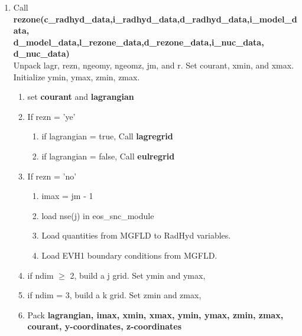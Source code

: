 \documentclass[11pt,doublespace]{article}
\begin{document}
\begin{itemize}
\begin{enumerate}
\begin{enumerate}
  \item Call {\bf rezone(c\_radhyd\_data,i\_radhyd\_data,d\_radhyd\_data,i\_model\_data,\\
  d\_model\_data,l\_rezone\_data,d\_rezone\_data,i\_nuc\_data, d\_nuc\_data)}\\
  Unpack lagr, rezn, ngeomy, ngeomz, jm, and r. Set courant, xmin, and xmax.\\
  Initialize ymin, ymax, zmin, zmax.
\begin{enumerate}
  \item set {\bf courant} and {\bf lagrangian}
  \item If rezn = 'ye'
\begin{enumerate}
  \item if  lagrangian = true, Call {\bf lagregrid}
  \item if   lagrangian = false, Call {\bf eulregrid}
\end{enumerate}
  \item If rezn = 'no'
\begin{enumerate}
  \item imax = jm - 1
  \item load nse(j) in eos\_snc\_module
  \item Load quantities from MGFLD to RadHyd variables.
  \item Load EVH1 boundary conditions from MGFLD.
\end{enumerate}
  \item if ndim $\ge$ 2, build a j grid. Set ymin and ymax,
  \item if ndim = 3, build a k grid. Set zmin and zmax,
  \item Pack {\bf lagrangian, imax, xmin, xmax, ymin, ymax, zmin, zmax, courant, y-coordinates, z-coordinates}
\end{enumerate}


\end{enumerate}
\end{enumerate}
\end{itemize}
\end{document}
